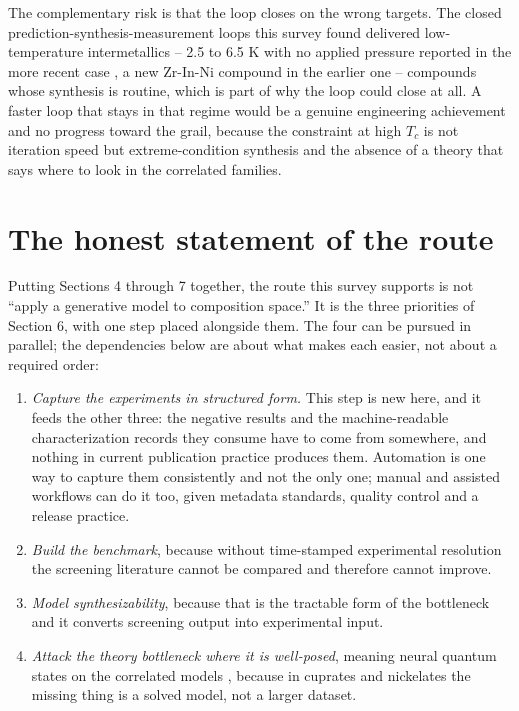 \documentclass[
  11pt,
]{article}
\providecommand{\tightlist}{%
  \setlength{\itemsep}{0pt}\setlength{\parskip}{0pt}}
\begin{document}
The complementary risk is that the loop closes on the wrong targets. The
closed prediction-synthesis-measurement loops this survey found
delivered low-temperature intermetallics -- 2.5 to 6.5 K with no applied
pressure reported in the more recent case \citep{li2026agentic}, a new
Zr-In-Ni compound in the earlier one \citep{pogue2022closed} --
compounds whose synthesis is routine, which is part of why the loop
could close at all. A faster loop that stays in that regime would be a
genuine engineering achievement and no progress toward the grail,
because the constraint at high \(T_c\) is not iteration speed but
extreme-condition synthesis and the absence of a theory that says where
to look in the correlated families.

\section{The honest statement of the
route}\label{the-honest-statement-of-the-route}

Putting Sections 4 through 7 together, the route this survey supports is
not ``apply a generative model to composition space.'' It is the three
priorities of Section 6, with one step placed alongside them. The four
can be pursued in parallel; the dependencies below are about what makes
each easier, not about a required order:

\begin{enumerate}
\def\labelenumi{\arabic{enumi}.}
\tightlist
\item
  \emph{Capture the experiments in structured form.} This step is new
  here, and it feeds the other three: the negative results and the
  machine-readable characterization records they consume have to come
  from somewhere, and nothing in current publication practice produces
  them. Automation is one way to capture them consistently and not the
  only one; manual and assisted workflows can do it too, given metadata
  standards, quality control and a release practice.
\item
  \emph{Build the benchmark}, because without time-stamped experimental
  resolution the screening literature cannot be compared and therefore
  cannot improve.
\item
  \emph{Model synthesizability}, because that is the tractable form of
  the bottleneck and it converts screening output into experimental
  input.
\item
  \emph{Attack the theory bottleneck where it is well-posed}, meaning
  neural quantum states on the correlated models
  \citep{lange2024simulating, rende2026superconductivity}, because in
  cuprates and nickelates the missing thing is a solved model, not a
  larger dataset.
\end{enumerate}
\end{document}

